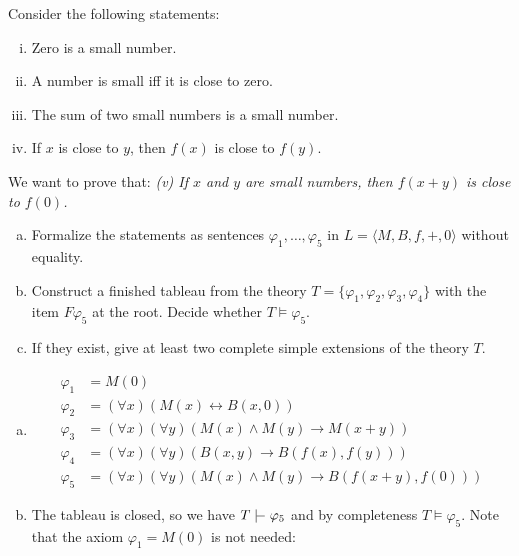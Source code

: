\begin{problem}

    Consider the following statements:
    \begin{enumerate}[(i)] \it 
        \item Zero is a small number.
        \item A number is small iff it is close to zero.
        \item The sum of two small numbers is a small number.
        \item If $x$ is close to $y$, then $f(x)$ is close to $f(y)$.
    \end{enumerate}

    We want to prove that: {\it (v) If $x$ and $y$ are small numbers, then $f(x+y)$ is close to $f(0)$.}

    \begin{enumerate}[(a)]
        \item Formalize the statements as sentences $\varphi_1,\dots,\varphi_5$ in $L=\langle M,B,f,+,0\rangle$ without equality.        
        \item Construct a finished tableau from the theory $T=\{\varphi_1,\varphi_2,\varphi_3,\varphi_4\}$ with the item $F\varphi_5$ at the root. Decide whether $T\models \varphi_5$.
        \item If they exist, give at least two complete simple extensions of the theory $T$.
    \end{enumerate}

    \begin{solution}

        \begin{enumerate}[(a)]
            \item \begin{align*}
                \varphi_1 & = M(0) \\
                \varphi_2 & = (\forall x)(M(x)\leftrightarrow B(x,0)) \\
                \varphi_3 & = (\forall x)(\forall y)(M(x)\wedge M(y)\to M(x+y)) \\
                \varphi_4 & = (\forall x)(\forall y)(B(x,y)\to B(f(x),f(y))) \\
                \varphi_5 & = (\forall x)(\forall y)(M(x)\wedge M(y)\to B(f(x+y),f(0)))
            \end{align*}

            \item The tableau is closed, so we have $T\proves \varphi_5$ and by completeness $T\models \varphi_5$. Note that the axiom $\varphi_1 = M(0)$ is not needed:
            

\end{enumerate}
\end{solution}
\end{problem}
